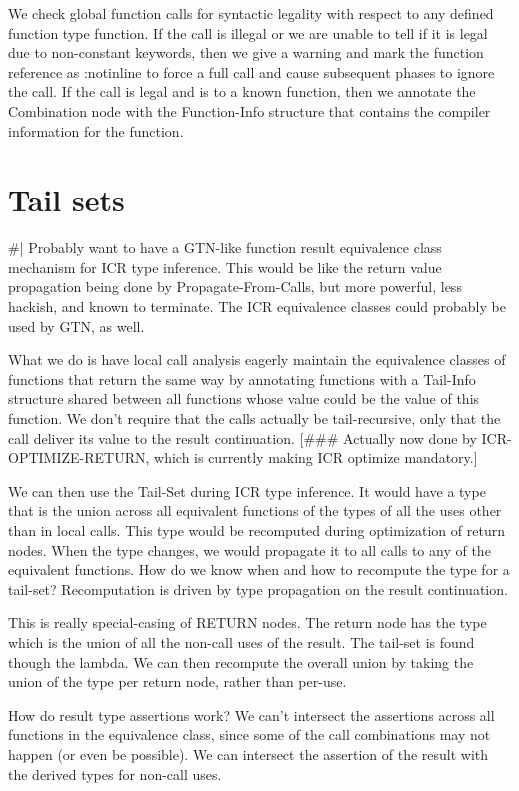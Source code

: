 We check global function calls for syntactic legality with respect to any
defined function type function.  If the call is illegal or we are unable to
tell if it is legal due to non-constant keywords, then we give a warning and
mark the function reference as :notinline to force a full call and cause
subsequent phases to ignore the call.  If the call is legal and is to a known
function, then we annotate the Combination node with the Function-Info
structure that contains the compiler information for the function.


\section{Tail sets}
\#|
Probably want to have a GTN-like function result equivalence class mechanism
for ICR type inference.  This would be like the return value propagation being
done by Propagate-From-Calls, but more powerful, less hackish, and known to
terminate.  The ICR equivalence classes could probably be used by GTN, as well.

What we do is have local call analysis eagerly maintain the equivalence classes
of functions that return the same way by annotating functions with a Tail-Info
structure shared between all functions whose value could be the value of this
function.  We don't require that the calls actually be tail-recursive, only
that the call deliver its value to the result continuation.  [\#\#\# Actually
now done by ICR-OPTIMIZE-RETURN, which is currently making ICR optimize
mandatory.]

We can then use the Tail-Set during ICR type inference.  It would have a type
that is the union across all equivalent functions of the types of all the uses
other than in local calls.  This type would be recomputed during optimization
of return nodes.  When the type changes, we would propagate it to all calls to
any of the equivalent functions.  How do we know when and how to recompute the
type for a tail-set?  Recomputation is driven by type propagation on the result
continuation.

This is really special-casing of RETURN nodes.  The return node has the type
which is the union of all the non-call uses of the result.  The tail-set is
found though the lambda.  We can then recompute the overall union by taking the
union of the type per return node, rather than per-use.


How do result type assertions work?  We can't intersect the assertions across
all functions in the equivalence class, since some of the call combinations may
not happen (or even be possible).  We can intersect the assertion of the result
with the derived types for non-call uses.

